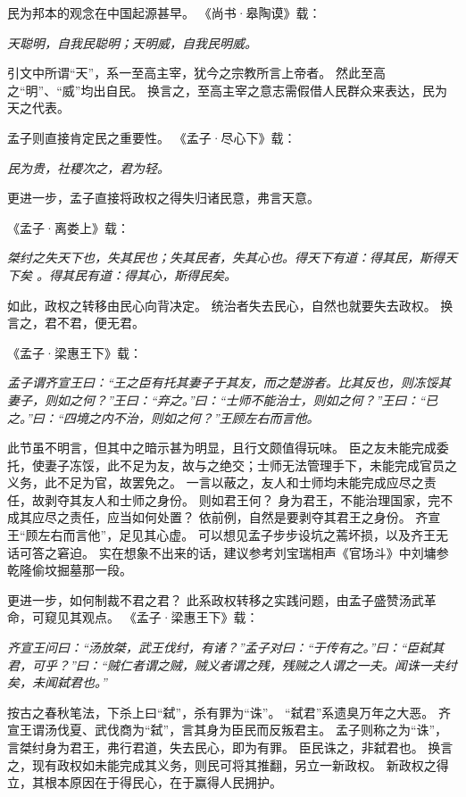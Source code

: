 \documentclass[11pt]{article}
\begin{document}
\newline

民为邦本的观念在中国起源甚早。
《尚书·皋陶谟》载：
  
\textit{天聪明，自我民聪明；天明威，自我民明威。}

引文中所谓“天”，系一至高主宰，犹今之宗教所言上帝者。
然此至高之“明”、“威”均出自民。
换言之，至高主宰之意志需假借人民群众来表达，民为天之代表。

\newline

孟子则直接肯定民之重要性。
《孟子·尽心下》载：

\textit{民为贵，社稷次之，君为轻。}

更进一步，孟子直接将政权之得失归诸民意，弗言天意。

《孟子·离娄上》载：

\textit{桀纣之失天下也，失其民也；失其民者，失其心也。得天下有道：得其民，斯得天下矣 。得其民有道：得其心，斯得民矣。}

如此，政权之转移由民心向背决定。
统治者失去民心，自然也就要失去政权。
换言之，君不君，便无君。

《孟子·梁惠王下》载：
  
\textit{孟子谓齐宣王曰：“王之臣有托其妻子于其友，而之楚游者。比其反也，则冻馁其妻子，则如之何？”王曰：“弃之。”曰：“士师不能治士，则如之何？”王曰：“已之。”曰：“四境之内不治，则如之何？”王顾左右而言他。}

此节虽不明言，但其中之暗示甚为明显，且行文颇值得玩味。
臣之友未能完成委托，使妻子冻馁，此不足为友，故与之绝交；士师无法管理手下，未能完成官员之义务，此不足为官，故罢免之。
一言以蔽之，友人和士师均未能完成应尽之责任，故剥夺其友人和士师之身份。
则如君王何？
身为君王，不能治理国家，完不成其应尽之责任，应当如何处置？
依前例，自然是要剥夺其君王之身份。
齐宣王“顾左右而言他”，足见其心虚。
可以想见孟子步步设坑之蔫坏损，以及齐王无话可答之窘迫。
实在想象不出来的话，建议参考刘宝瑞相声《官场斗》中刘墉参乾隆偷坟掘墓那一段。

\newline

更进一步，如何制裁不君之君？
此系政权转移之实践问题，由孟子盛赞汤武革命，可窥见其观点。
《孟子·梁惠王下》载：

\textit{齐宣王问曰：“汤放桀，武王伐纣，有诸？”孟子对曰：“于传有之。”曰：“臣弑其君，可乎？”曰：“贼仁者谓之贼，贼义者谓之残，残贼之人谓之一夫。闻诛一夫纣矣，未闻弑君也。”}

按古之春秋笔法，下杀上曰“弑”，杀有罪为“诛”。
“弑君”系遗臭万年之大恶。
齐宣王谓汤伐夏、武伐商为“弑”，言其身为臣民而反叛君主。
孟子则称之为“诛”，言桀纣身为君王，弗行君道，失去民心，即为有罪。
臣民诛之，非弑君也。
换言之，现有政权如未能完成其义务，则民可将其推翻，另立一新政权。
新政权之得立，其根本原因在于得民心，在于赢得人民拥护。
  
\end{document}
